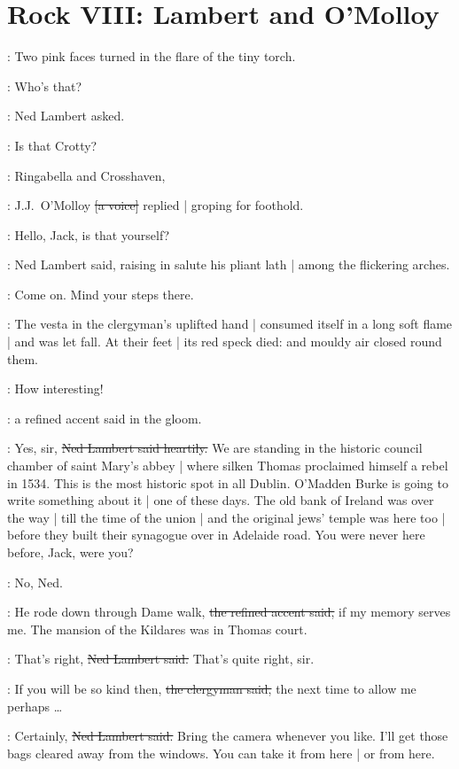 \section*{Rock VIII: Lambert and O'Molloy}


:
Two pink faces turned in the flare of the tiny torch.

\lambert:
Who's that?

:
Ned Lambert asked.

\lambert:
Is that Crotty?

\jjom:
Ringabella and Crosshaven,%

:
J.J.~O'Molloy \sout{[a voice]} replied |
groping for foothold.

\lambert:
Hello, Jack, is that yourself?

:
Ned Lambert said,
raising in salute his pliant lath |
among the flickering arches.

\lambert:
Come on.
Mind your steps there.

:
The vesta in the clergyman's uplifted hand |
consumed itself in a long soft flame |
and was let fall.
At their feet |
its red speck died:
and mouldy air
closed round them.

\revlove:
How interesting!

:
a refined accent said in the gloom.

\lambert:
Yes, sir,
\sout{Ned Lambert said heartily.}
We are standing in the historic council chamber of saint Mary's abbey |
where silken Thomas proclaimed himself a rebel in 1534.
This is the most historic spot in all Dublin.
O'Madden Burke is going to write something about it%
 |
one of these days.
The old bank of Ireland was over the way |
till the time of the union |
and the original jews' temple was here too |
before they built their synagogue over in Adelaide road.
You were never here before, Jack,
were you?

\jjom:
No, Ned.

\revlove:
He rode down through Dame walk,
\sout{the refined accent said,}
if my memory serves me.
The mansion of the Kildares was in Thomas court.

\lambert:
That's right,
\sout{Ned Lambert said.}
That's quite right, sir.

\revlove:
If you will be so kind then,
\sout{the clergyman said,}
the next time to allow
me perhaps \ldots

\lambert:
Certainly,
\sout{Ned Lambert said.}%
Bring the camera whenever you like.
I'll get those bags cleared away from the windows.
You can take it from here |
or from here.

